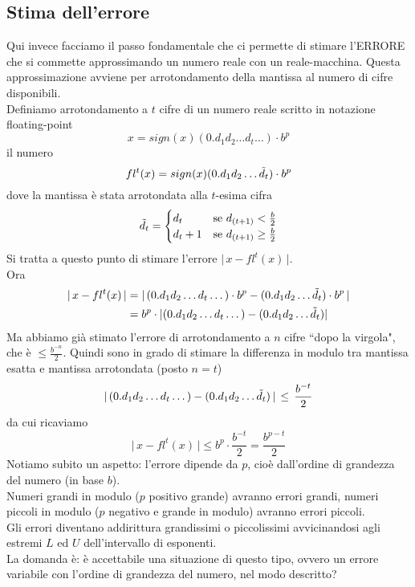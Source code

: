\subsection{Stima dell'errore}
Qui invece facciamo il passo fondamentale che ci permette di stimare l'ERRORE che si commette approssimando un numero reale con un reale-macchina. Questa approssimazione avviene per arrotondamento della mantissa al numero di cifre disponibili. \\
Definiamo arrotondamento a $t$ cifre di un numero reale scritto in notazione floating-point \[ x = sign(x)(0.d_1 d_2 \dotsc d_t \dotsc) \cdot b^p \]
il numero \[ fl^t(x) = sign(x)(0.d_1 d_2 \dotsc \Tilde{d}_t) \cdot b^p \]
dove la mantissa è stata arrotondata alla $t$-esima cifra
\[\Tilde{d}_t = 
\begin{cases}
    d_t & \text{se $d_{(t+1)} < \frac{b}{2}$} \\
    d_t+1 & \text{se $d_{(t+1)} \ge \frac{b}{2}$}
\end{cases}
\]
Si tratta a questo punto di stimare l'errore $\lvert \, x - fl^t(x) \, \rvert$.\\
Ora
\[ \begin{split}
    \lvert \, x - fl^t(x) \, \rvert & = \lvert \, (0.d_1 d_2 \dotsc d_t \dotsc) \cdot b^p - (0.d_1 d_2 \dotsc \Tilde{d}_t) \cdot b^p \, \rvert \\
    & = b^p \cdot \lvert (0.d_1 d_2 \dotsc d_t \dotsc) - (0.d_1 d_2 \dotsc \Tilde{d}_t) \rvert
    \end{split}\]
Ma abbiamo già stimato l'errore di arrotondamento a $n$ cifre ``dopo la virgola", che è $\le \frac{b^{-n}}{2}$. Quindi sono in grado di stimare la differenza in modulo tra mantissa esatta e mantissa arrotondata (posto $n = t$)
\[ \lvert \, (0.d_1 d_2 \dotsc d_t \dotsc) - (0.d_1 d_2 \dotsc \Tilde{d}_t) \, \rvert \, \le \, \frac{b^{-t}}{2} \] da cui ricaviamo
\[ \lvert \, x - fl^t(x) \, \rvert \le b^p \cdot \frac{b^{-t}}{2} = \frac{b^{p-t}}{2} \]
Notiamo subito un aspetto: l'errore dipende da $p$, cioè dall'ordine di grandezza del numero (in base $b$).\\
Numeri grandi in modulo ($p$ positivo grande) avranno errori grandi, numeri piccoli in modulo ($p$ negativo e grande in modulo) avranno errori piccoli. \\
Gli errori diventano addirittura grandissimi o piccolissimi avvicinandosi agli estremi $L$ ed $U$ dell'intervallo di esponenti. \\
La domanda è: è accettabile una situazione di questo tipo, ovvero un errore variabile con l'ordine di grandezza del numero, nel modo descritto? \\
